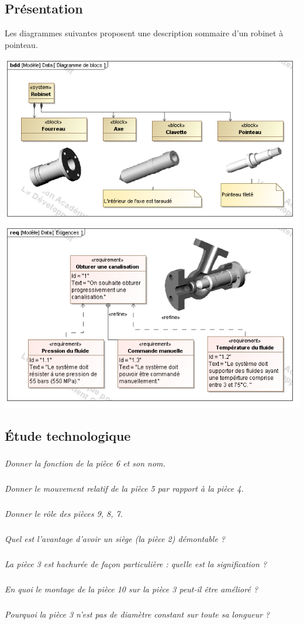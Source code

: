 \documentclass[10pt,fleqn]{article} %
\begin{document}

\vspace{10cm}
\pagestyle{fancy}
\thispagestyle{plain}


\def\columnseprulecolor{\color{ocre}}
\setlength{\columnseprule}{0.4pt} 
\begin{multicols}{2}
\subsection*{Présentation}

Les diagrammes suivantes proposent une description sommaire d'un robinet à pointeau.
\begin{center}
\includegraphics[width=\linewidth]{images/blocs}
\includegraphics[width=\linewidth]{images/Exigences}
\end{center}

\subsection*{Étude technologique}
\subparagraph{}\textit{Donner la fonction de la pièce 6 et son nom.}
\subparagraph{}\textit{Donner le mouvement relatif de la pièce 5 par rapport à la pièce 4.}
\subparagraph{}\textit{Donner le rôle des pièces 9, 8, 7. }
\subparagraph{}\textit{Quel est l’avantage d’avoir un siège (la pièce 2) démontable ?}
\subparagraph{}\textit{La pièce 3 est hachurée de façon particulière : quelle est la signification ?}
\subparagraph{}\textit{En quoi le montage de la pièce 10 sur la pièce 3 peut-il être amélioré ?}
\subparagraph{}\textit{Pourquoi la pièce 3 n’est pas de diamètre constant sur toute sa longueur ?}


\end{multicols}
\end{document}
